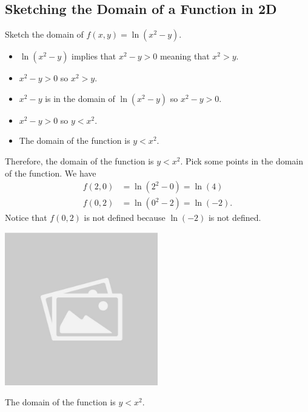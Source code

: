 \documentclass{article}
\begin{document}
\subsection*{Sketching the Domain of a Function in 2D}
\begin{examplebox}
    Sketch the domain of \( f(x, y) = \ln(x^2 - y) \).
\begin{solutionbox}
\begin{notebox}
\begin{itemize}
    \item \( \ln(x^2 - y) \) implies that \( x^2 - y > 0\) meaning that \( x^2 > y \).
    \item \( x^2 - y > 0 \) so \( x^2 > y \).
    \item \( x^2 - y \) is in the domain of \( \ln(x^2 - y) \) so \( x^2 - y > 0 \).
    \item \( x^2 - y > 0 \) so \( y < x^2 \).
    \item The domain of the function is \( y < x^2 \).
\end{itemize}
\end{notebox}
Therefore, the domain of the function is \( y < x^2 \).
Pick some points in the domain of the function. We have
\begin{align*}
    f(2, 0) &= \ln(2^2 - 0) = \ln(4) \\
    f(0, 2) &= \ln(0^2 - 2) = \ln(-2).
\end{align*}
Notice that \( f(0, 2) \) is not defined because \( \ln(-2) \) is not defined.
\begin{illustrationbox}
\begin{center}
    \includegraphics[width=0.5\textwidth]{sample_image.jpg}
\end{center}
\end{illustrationbox}
\begin{answerbox}
The domain of the function is \( y < x^2 \).
\end{answerbox}
\end{solutionbox}
\end{examplebox}
\end{document}
